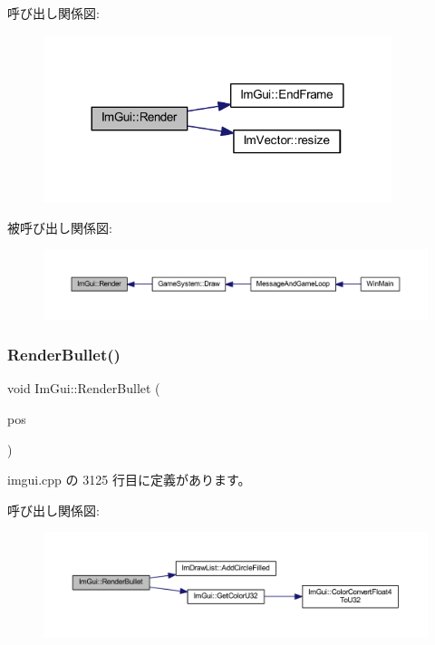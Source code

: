呼び出し関係図\+:\nopagebreak
\begin{figure}[H]
\begin{center}
\leavevmode
\includegraphics[width=288pt]{namespace_im_gui_ab51a164f547317c16c441f1599e3946d_cgraph}
\end{center}
\end{figure}
被呼び出し関係図\+:\nopagebreak
\begin{figure}[H]
\begin{center}
\leavevmode
\includegraphics[width=350pt]{namespace_im_gui_ab51a164f547317c16c441f1599e3946d_icgraph}
\end{center}
\end{figure}
\mbox{\label{namespace_im_gui_a2d0e4160081b3953fc8f88e2d8e8da15}} 
\subsubsection{\texorpdfstring{Render\+Bullet()}{RenderBullet()}}
{\footnotesize\ttfamily void Im\+Gui\+::\+Render\+Bullet (\begin{DoxyParamCaption}\item[{\mbox{\hyperlink{struct_im_vec2}{Im\+Vec2}}}]{pos }\end{DoxyParamCaption})}



 imgui.\+cpp の 3125 行目に定義があります。

呼び出し関係図\+:\nopagebreak
\begin{figure}[H]
\begin{center}
\leavevmode
\includegraphics[width=350pt]{namespace_im_gui_a2d0e4160081b3953fc8f88e2d8e8da15_cgraph}
\end{center}
\end{figure}
\mbox{\label{namespace_im_gui_a6adfc430445ed42a65556ffb0d58a8b8}} 
